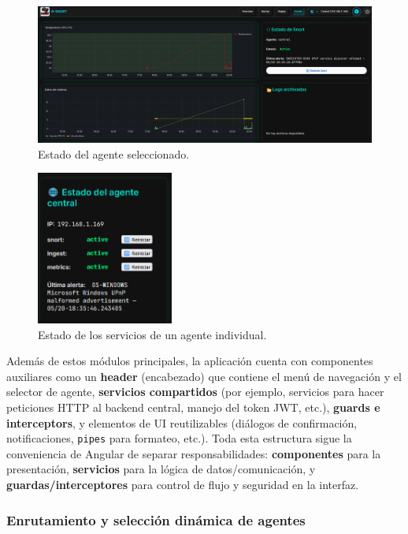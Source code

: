 \documentclass[11pt,a4paper,twoside]{report}
\begin{document}
\begin{itemize}
	\begin{figure}[H]
		\centering
		\includegraphics[width=1\textwidth]{documento/estado.png}
		\caption{Estado del agente seleccionado.}
		\label{fig:status-frontend}
	\end{figure}
	
		\begin{figure}[H]
		\centering
		\includegraphics[width=0.4\textwidth]{documento/estado_agente.png}
		\caption{Estado de los servicios de un agente individual.}
		\label{fig:status-agent-frontend}
	\end{figure}
\end{itemize}

Además de estos módulos principales, la aplicación cuenta con componentes auxiliares como un \textbf{header} (encabezado) que contiene el menú de navegación y el selector de agente, \textbf{servicios compartidos} (por ejemplo, servicios para hacer peticiones HTTP al backend central, manejo del token JWT, etc.), \textbf{guards e interceptors}, y elementos de UI reutilizables (diálogos de confirmación, notificaciones, \texttt{pipes} para formateo, etc.). Toda esta estructura sigue la conveniencia de Angular de separar responsabilidades: \textbf{componentes} para la presentación, \textbf{servicios} para la lógica de datos/comunicación, y \textbf{guardas/interceptores} para control de flujo y seguridad en la interfaz.

\subsubsection{Enrutamiento y selección dinámica de agentes}
\end{document}
